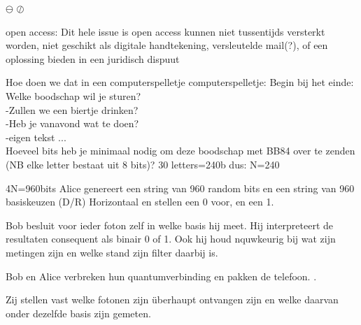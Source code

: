\documentclass[../../main.tex]{subfiles}
\begin{document}
$\ominus$ 
$\oslash$ 






open access:
\cite{BENNETT20147} Dit hele issue is open access
kunnen niet tussentijds versterkt worden, niet geschikt als digitale handtekening, versleutelde mail(?), of een oplossing bieden in een juridisch dispuut 
\cite{wootters1982single}


Hoe doen we dat in een computerspelletje
computerspelletje:
Begin bij het einde:\\
Welke boodschap wil je sturen?\\
-Zullen we een biertje drinken?\\
-Heb je vanavond wat te doen?\\
-eigen tekst ...\\

Hoeveel bits heb je minimaal nodig om deze boodschap met BB84 over te zenden (NB elke letter bestaat uit 8 bits)? 30 letters=240b dus: N=240

4N=960bits
Alice genereert een string van 960 random bits en een string van 
960 basiskeuzen (D/R)
Horizontaal  en  stellen een 0 voor,  en  een 1.

Bob besluit voor ieder foton zelf in welke basis hij meet. Hij interpreteert de resultaten consequent als binair 0 of 1. Ook hij houd nquwkeurig bij wat zijn metingen zijn en welke stand zijn filter daarbij is.

Bob en Alice verbreken hun quantumverbinding en pakken de telefoon. .

Zij stellen vast welke fotonen zijn \"uberhaupt ontvangen zijn en welke daarvan onder dezelfde basis zijn gemeten. 
\end{document}
